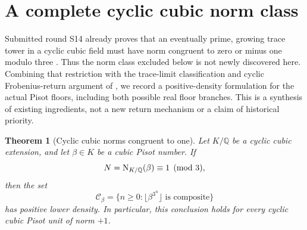 \documentclass[11pt,a4paper]{article}
\newtheorem{theorem}{Theorem}[section]
\theoremstyle{definition}\newtheorem{definition}[theorem]{Definition}
\theoremstyle{remark}\newtheorem{remark}[theorem]{Remark}
\newcommand{\Q}{\mathbb Q}\newcommand{\R}{\mathbb R}
\begin{document}
\section{A complete cyclic cubic norm class}
\label{pis:rescyc:sec:cyclic}
Submitted round S14 already proves that an eventually prime,
growing trace tower in a cyclic cubic field must have norm congruent
to zero or minus one modulo three \cite[Theorem~1]{S14}. Thus the
norm class excluded below is not newly discovered here. Combining
that restriction with the trace-limit classification and cyclic
Frobenius-return argument of \cite{Keio009}, we record a
positive-density formulation for the actual Pisot floors, including
both possible real floor branches. This is a synthesis of existing
ingredients, not a new return mechanism or a claim of historical
priority.

\begin{theorem}[Cyclic cubic norms congruent to one]
\label{pis:rescyc:thm:norm-one-mod-three}
Let $K/\Q$ be a cyclic cubic extension, and let $\beta\in K$ be a
cubic Pisot number. If
\[
 N=\Nm_{K/\Q}(\beta)\equiv1\pmod3,
\]
then the set
\[
 \mathcal C_\beta=
 \{n\ge0:\lfloor\beta^{3^n}\rfloor\text{ is composite}\}
\]
has positive lower density. In particular, this conclusion holds
for every cyclic cubic Pisot unit of norm $+1$.
\end{theorem}
\end{document}
